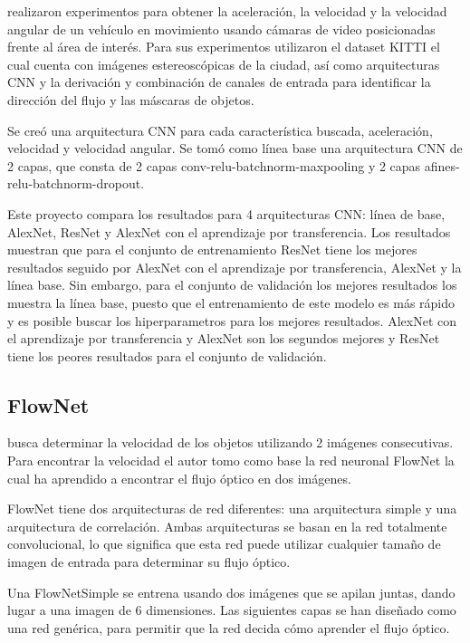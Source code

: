 \citeauthor{zhang2017Vehicle} realizaron experimentos para obtener la aceleración, la velocidad y la velocidad angular de un vehículo en movimiento usando cámaras de video posicionadas frente al área de interés. Para sus experimentos utilizaron el dataset KITTI el cual cuenta con imágenes estereoscópicas de la ciudad, así como arquitecturas CNN y la derivación y combinación de canales de entrada para identificar la dirección del flujo y las máscaras de objetos.

Se creó una arquitectura CNN para cada característica buscada, aceleración, velocidad y velocidad angular. Se tomó como línea base una arquitectura CNN de 2 capas, que consta de 2 capas conv-relu-batchnorm-maxpooling y 2 capas afines-relu-batchnorm-dropout.

Este proyecto compara los resultados para 4 arquitecturas CNN: línea de base, AlexNet, ResNet y AlexNet con el aprendizaje por transferencia.  Los resultados muestran que para el conjunto de entrenamiento ResNet tiene los mejores resultados seguido por AlexNet con el aprendizaje por transferencia, AlexNet y la línea base. Sin embargo, para el conjunto de validación  los mejores resultados los muestra la línea base, puesto que el entrenamiento de este modelo es más rápido y es posible buscar los hiperparametros para los mejores resultados. AlexNet con el aprendizaje por transferencia y AlexNet son los segundos mejores y ResNet tiene los peores resultados para el conjunto de validación.

\subsection{FlowNet}

\citeauthor{loor2017Visual} busca determinar la velocidad de los objetos utilizando 2 imágenes consecutivas. Para encontrar la velocidad el autor tomo como base la red neuronal FlowNet la cual ha aprendido a encontrar el flujo óptico en dos imágenes.

FlowNet tiene dos arquitecturas de red diferentes: una arquitectura simple y una arquitectura de correlación. Ambas arquitecturas se basan en la red totalmente convolucional, lo que significa que esta red puede utilizar cualquier tamaño de imagen de entrada para determinar su flujo óptico.

Una FlowNetSimple se entrena usando dos imágenes que se apilan juntas, dando lugar a una imagen de 6 dimensiones. Las siguientes capas se han diseñado como una red genérica, para permitir que la red decida cómo aprender el flujo óptico.

